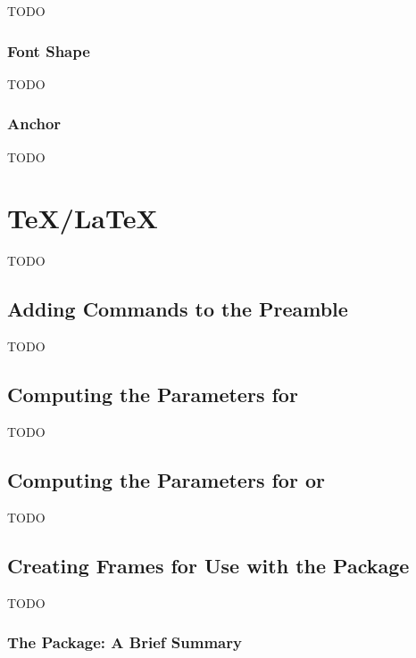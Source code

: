 
TODO


\subsection{Font Shape}\label{sec:fontshape}


TODO


\subsection{Anchor}\label{sec:fontanchor}


TODO


\chapter{\TeX/\LaTeX}\label{sec:tex}

TODO


\section{Adding Commands to the Preamble}\label{sec:preamble}

TODO


\section{Computing the Parameters for }\label{sec:parshape}

TODO


\section{Computing the Parameters for  or
}
\label{sec:shapepar}

TODO


\section{Creating Frames for Use with the  Package}
\label{sec:flowframe}

TODO


\subsection{The  Package: A Brief Summary}
\label{sec:flowframesummary}

